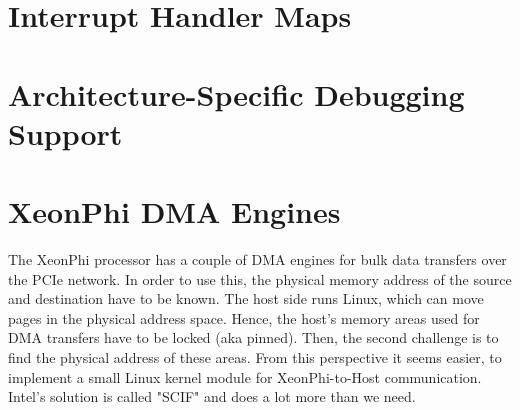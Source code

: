 



\section{Interrupt Handler Maps}




\section{Architecture-Specific Debugging Support}



\section{XeonPhi DMA Engines}

The XeonPhi processor has a couple of DMA engines for bulk data transfers over the PCIe network. In order to use this, the physical memory address of the source and destination have to be known. The host side runs Linux, which can move pages in the physical address space. Hence, the host's memory areas used for DMA transfers have to be locked (aka pinned). Then, the second challenge is to find the physical address of these areas. From this perspective it seems easier, to implement a small Linux kernel module for XeonPhi-to-Host communication. Intel's solution is called "SCIF" and does a lot more than we need.

